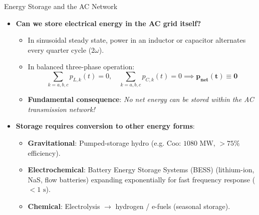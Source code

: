 \begin{frame}{Energy Storage and the AC Network}
\begin{itemize}
\item \textbf{Can we store electrical energy in the AC grid itself?}
  \begin{itemize}
    \item In sinusoidal steady state, power in an inductor or capacitor alternates every quarter cycle ($2\omega$).
    \item In balanced three-phase operation:
    $$\sum_{k=a,b,c} p_{L,k}(t) = 0, \quad \sum_{k=a,b,c} p_{C,k}(t) = 0 \implies \mathbf{p_{\text{net}}(t) \equiv 0}$$
    \item \textbf{Fundamental consequence}: \emph{No net energy can be stored within the AC transmission network!}
  \end{itemize}
\item \textbf{Storage requires conversion to other energy forms}:
  \begin{itemize}
    \item \textbf{Gravitational}: Pumped-storage hydro (e.g. Coo: $1080\text{ MW}$, $>75\%$ efficiency).
    \item \textbf{Electrochemical}: Battery Energy Storage Systems (BESS) (lithium-ion, NaS, flow batteries) expanding exponentially for fast frequency response ($<1\text{ s}$).
    \item \textbf{Chemical}: Electrolysis $\rightarrow$ hydrogen / e-fuels (seasonal storage).
  \end{itemize}
\end{itemize}
\end{frame}

